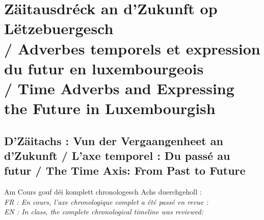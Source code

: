 \vspace{1.5em}

\section[Zäitausdréck an d'Zukunft op Lëtzebuergesch / Time Adverbs and the Future]{Zäitausdréck an d'Zukunft op Lëtzebuergesch \\/ Adverbes temporels et expression du futur en luxembourgeois \\/ Time Adverbs and Expressing the Future in Luxembourgish}

\subsection{D'Zäitachs : Vun der Vergaangenheet an d'Zukunft / L'axe temporel : Du passé au futur / The Time Axis: From Past to Future}

Am Cours gouf déi komplett chronologesch Achs duerchgeholl : \\
\textit{FR : En cours, l'axe chronologique complet a été passé en revue :} \\
\textit{EN : In class, the complete chronological timeline was reviewed:}

